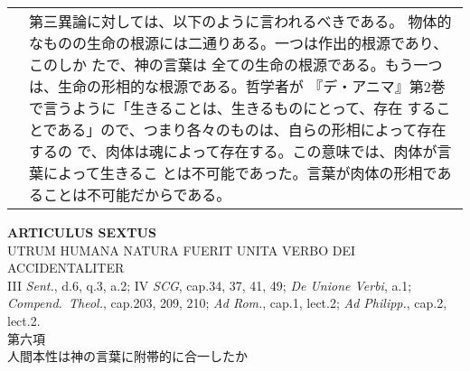 \documentclass[10pt]{jsarticle} %
\begin{document}
\begin{longtable}{p{21em}p{21em}}
&

第三異論に対しては、以下のように言われるべきである。
物体的なものの生命の根源には二通りある。一つは作出的根源であり、このしか
 たで、神の言葉は
全ての生命の根源である。もう一つは、生命の形相的な根源である。哲学者が
 『デ・アニマ』第2巻で言うように「生きることは、生きるものにとって、存在
 することである」ので、つまり各々のものは、自らの形相によって存在するの
 で、肉体は魂によって存在する。この意味では、肉体が言葉によって生きるこ
 とは不可能であった。言葉が肉体の形相であることは不可能だからである。


\end{longtable}
\newpage


\begin{center}
 {\Large {\bf ARTICULUS SEXTUS}}\\
 {\large UTRUM HUMANA NATURA FUERIT UNITA VERBO DEI ACCIDENTALITER}\\
 {\footnotesize III {\itshape Sent.}, d.6, q.3, a.2; IV {\itshape SCG},
 cap.34, 37, 41, 49; {\itshape De Unione Verbi}, a.1; {\itshape
 Compend.~Theol.}, cap.203, 209, 210; {\itshape Ad Rom.}, cap.1, lect.2;
 {\itshape Ad Philipp.}, cap.2, lect.2.}\\
 {\Large 第六項\\人間本性は神の言葉に附帯的に合一したか}
\end{center}
\end{document}
